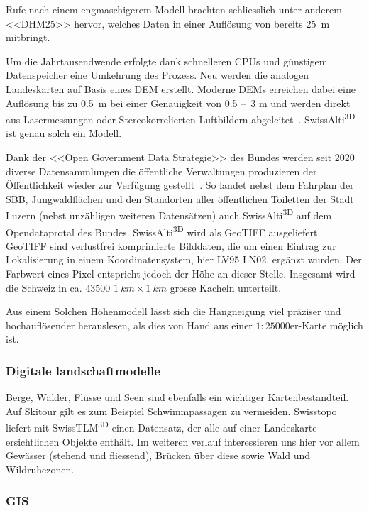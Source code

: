 \begin{multicols}{2}
Rufe nach einem engmaschigerem Modell brachten schliesslich unter anderem <<DHM25>> hervor, welches Daten in einer Auflösung von bereits \qty{25}{m} mitbringt.~\cite{swisstopohistdem}

Um die Jahrtausendwende erfolgte dank schnelleren CPUs und günstigem Datenspeicher eine Umkehrung des Prozess. Neu werden die analogen Landeskarten auf Basis eines DEM erstellt. Moderne DEMs erreichen dabei eine Auflösung bis zu \qty{0.5}{m} bei einer Genauigkeit von 0.5 --~3 \unit{m} und werden direkt aus Lasermessungen oder Stereokorrelierten Luftbildern abgeleitet~\cite{alti3dprod}. SwissAlti\textsuperscript{3D} ist genau solch ein Modell.

Dank der <<Open Government Data Strategie>> des Bundes werden seit 2020 diverse Datensammlungen die öffentliche Verwaltungen produzieren der Öffentlichkeit wieder zur Verfügung gestellt~\cite{opendataswiss}.
So landet nebst dem Fahrplan der SBB, Jungwaldflächen und den Standorten aller öffentlichen Toiletten der Stadt Luzern (nebst unzähligen weiteren Datensätzen) auch  SwissAlti\textsuperscript{3D} auf dem Opendataprotal des Bundes.
SwissAlti\textsuperscript{3D} wird als GeoTIFF ausgeliefert. GeoTIFF sind verlustfrei komprimierte Bilddaten, die um einen Eintrag zur Lokalisierung in einem Koordinatensystem, hier LV95 LN02, ergänzt wurden. Der Farbwert eines Pixel entspricht jedoch der Höhe an dieser Stelle. Insgesamt wird die Schweiz in ca. $43500$ $\qty{1}{km} \times \qty{1}{km}$ grosse Kacheln unterteilt.~\cite{alti3dprod} 

Aus einem Solchen Höhenmodell lässt sich die Hangneigung viel präziser und hochauflösender herauslesen, als dies von Hand aus einer $1:25000$er-Karte möglich ist.

\subsubsection{Digitale landschaftmodelle}

Berge, Wälder, Flüsse und Seen sind ebenfalls ein wichtiger Kartenbestandteil. Auf Skitour gilt es zum Beispiel Schwimmpassagen zu vermeiden. Swisstopo liefert mit SwissTLM\textsuperscript{3D} einen Datensatz, der alle auf einer Landeskarte ersichtlichen Objekte enthält. Im weiteren verlauf interessieren uns hier vor allem Gewässer (stehend und fliessend), Brücken über diese sowie Wald und Wildruhezonen.

\subsubsection{GIS}\label{sec:gis}


\end{multicols}
